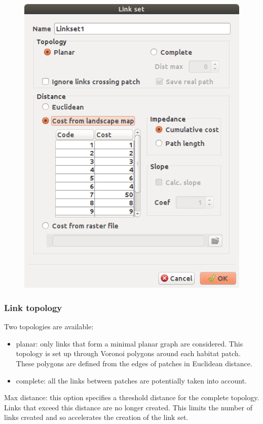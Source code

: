 \documentclass{article}
\begin{document}
\begin{figure}[H]
	\includegraphics[scale=0.5]{img/manual-en_img4.png}
\end{figure}


\subsubsection{Link topology}

Two topologies are available: 

\begin{itemize}
	\item planar: only links that form a minimal planar graph are considered. This topology is set up through Voronoi polygons around each habitat patch. These polygons are defined from the edges of patches in Euclidean distance.
	\item complete: all the links between patches are potentially taken into account. 
\end{itemize}

Max distance: this option specifies a threshold distance for the complete topology. Links that exceed this distance are no longer created. This limits the number of links created and so accelerates the creation of the link set.
\end{document}
